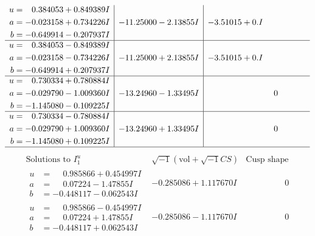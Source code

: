 \documentclass[1p]{elsarticle_modified}
\theoremstyle{definition}
\newcommand{\I}{\sqrt{-1}}
\begin{document}
$$\begin{array}{c|c|c}
\begin{aligned}
u &= \phantom{-}0.384053 + 0.849389 I \\
a &= -0.023158 + 0.734226 I \\
b &= -0.649914 - 0.207937 I\end{aligned}
 & -11.25000 - 2.13855 I & -3.51015 + 0. I\phantom{ +0.000000I} \\ \hline\begin{aligned}
u &= \phantom{-}0.384053 - 0.849389 I \\
a &= -0.023158 - 0.734226 I \\
b &= -0.649914 + 0.207937 I\end{aligned}
 & -11.25000 + 2.13855 I & -3.51015 + 0. I\phantom{ +0.000000I} \\ \hline\begin{aligned}
u &= \phantom{-}0.730334 + 0.780884 I \\
a &= -0.029790 - 1.009360 I \\
b &= -1.145080 - 0.109225 I\end{aligned}
 & -13.24960 - 1.33495 I & \phantom{-0.000000 } 0 \\ \hline\begin{aligned}
u &= \phantom{-}0.730334 - 0.780884 I \\
a &= -0.029790 + 1.009360 I \\
b &= -1.145080 + 0.109225 I\end{aligned}
 & -13.24960 + 1.33495 I & \phantom{-0.000000 } 0\\
 \hline 
 \end{array}$$\newpage$$\begin{array}{c|c|c}  
\text{Solutions to }I^u_{1}& \I (\text{vol} + \sqrt{-1}CS) & \text{Cusp shape}\\
 \hline 
\begin{aligned}
u &= \phantom{-}0.985866 + 0.454997 I \\
a &= \phantom{-}0.07224 - 1.47855 I \\
b &= -0.448117 - 0.062543 I\end{aligned}
 & -0.285086 + 1.117670 I & \phantom{-0.000000 } 0 \\ \hline\begin{aligned}
u &= \phantom{-}0.985866 - 0.454997 I \\
a &= \phantom{-}0.07224 + 1.47855 I \\
b &= -0.448117 + 0.062543 I\end{aligned}
 & -0.285086 - 1.117670 I & \phantom{-0.000000 } 0 \\ \hline\begin{aligned}

\end{aligned}
\end{array}$$
\end{document}
